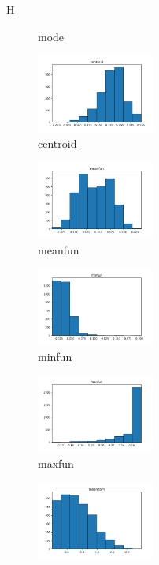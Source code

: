\documentclass[a4paper]{article}    %
\begin{document}
\begin{figure}{H}
\begin{subfigure}{0.32\textwidth}
        \caption{mode}
        \label{fig:sub_raw_10}
    \end{subfigure}\hfill
    \begin{subfigure}{0.32\textwidth}
        \centering
        \includegraphics[width=3.85cm]{raw_10_centroid}
        \caption{centroid}
        \label{fig:sub_raw_11}
    \end{subfigure}\hfill
    \begin{subfigure}{0.32\textwidth}
        \centering
        \includegraphics[width=3.85cm]{raw_11_meanfun}
        \caption{meanfun}
        \label{fig:sub_raw_12}
    \end{subfigure}\hfill
    \begin{subfigure}{0.32\textwidth}
        \centering
        \includegraphics[width=3.85cm]{raw_12_minfun}
        \caption{minfun}
        \label{fig:sub_raw_13}
    \end{subfigure}\hfill
    \begin{subfigure}{0.32\textwidth}
        \centering
        \includegraphics[width=3.85cm]{raw_13_maxfun}
        \caption{maxfun}
        \label{fig:sub_raw_14}
    \end{subfigure}\hfill
    \begin{subfigure}{0.32\textwidth}
        \centering
        \includegraphics[width=3.85cm]{raw_14_meandom}

\end{subfigure}
\end{figure}
\end{document}
